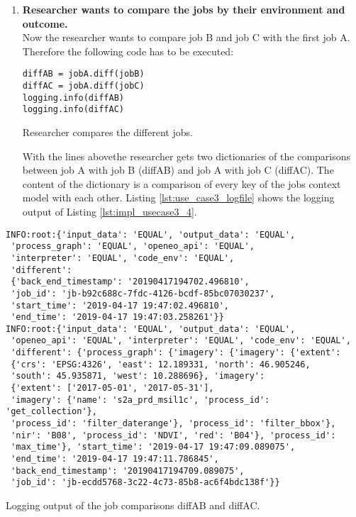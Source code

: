 \documentclass[draft,final]{vutinfth} %
\newenvironment{code}{\captionsetup{type=listing}}{}
\providecommand{\DIFaddtex}[1]{{\protect\color{blue}\uwave{#1}}} %
\providecommand{\DIFaddbegin}{} %
\providecommand{\DIFaddend}{} %
\providecommand{\DIFadd}[1]{\texorpdfstring{\DIFaddtex{#1}}{#1}} %
\begin{document}
\begin{enumerate}
\begin{code}
\end{code}

	\item \textbf{Researcher wants to compare the jobs by their environment and outcome.}\\
	Now the researcher wants to compare job B and job C with the first job A. Therefore the following code has to be executed:

	\begin{code}
		\begin{verbatim}
diffAB = jobA.diff(jobB)
diffAC = jobA.diff(jobC)
logging.info(diffAB)
logging.info(diffAC)
		\end{verbatim}
		\caption{Researcher compares the different jobs.}
		\label{lst:impl_usecase3_4}

	\end{code}

	With the lines above\DIFaddbegin \DIFadd{, }\DIFaddend the researcher gets two dictionaries of the comparisons between job A with job B (diffAB) and job A with job C (diffAC). The content of the dictionary is a comparison of every key of the jobs context model with each other. Listing \ref{lst:use_case3_logfile} shows the logging output of Listing \ref{lst:impl_usecase3_4}.
\end{enumerate}


\begin{code}
	\begin{verbatim}
INFO:root:{'input_data': 'EQUAL', 'output_data': 'EQUAL', 
 'process_graph': 'EQUAL', 'openeo_api': 'EQUAL', 
 'interpreter': 'EQUAL', 'code_env': 'EQUAL',
 'different': 
 {'back_end_timestamp': '20190417194702.496810', 
 'job_id': 'jb-b92c688c-7fdc-4126-bcdf-85bc07030237', 
 'start_time': '2019-04-17 19:47:02.496810', 
 'end_time': '2019-04-17 19:47:03.258261'}} 
INFO:root:{'input_data': 'EQUAL', 'output_data': 'EQUAL', 
 'openeo_api': 'EQUAL', 'interpreter': 'EQUAL', 'code_env': 'EQUAL',
 'different': {'process_graph': {'imagery': {'imagery': {'extent': 
 {'crs': 'EPSG:4326', 'east': 12.189331, 'north': 46.905246, 
 'south': 45.935871, 'west': 10.288696}, 'imagery': 
 {'extent': ['2017-05-01', '2017-05-31'], 
 'imagery': {'name': 's2a_prd_msil1c', 'process_id': 'get_collection'}, 
 'process_id': 'filter_daterange'}, 'process_id': 'filter_bbox'}, 
 'nir': 'B08', 'process_id': 'NDVI', 'red': 'B04'}, 'process_id': 
 'max_time'}, 'start_time': '2019-04-17 19:47:09.089075', 
 'end_time': '2019-04-17 19:47:11.786845', 
 'back_end_timestamp': '20190417194709.089075', 
 'job_id': 'jb-ecdd5768-3c22-4c73-85b8-ac6f4bdc138f'}}
	\end{verbatim}
	\caption{Logging output of the job comparisons diffAB and diffAC.}
	\label{lst:use_case3_logfile}
\end{code}
\end{document}
